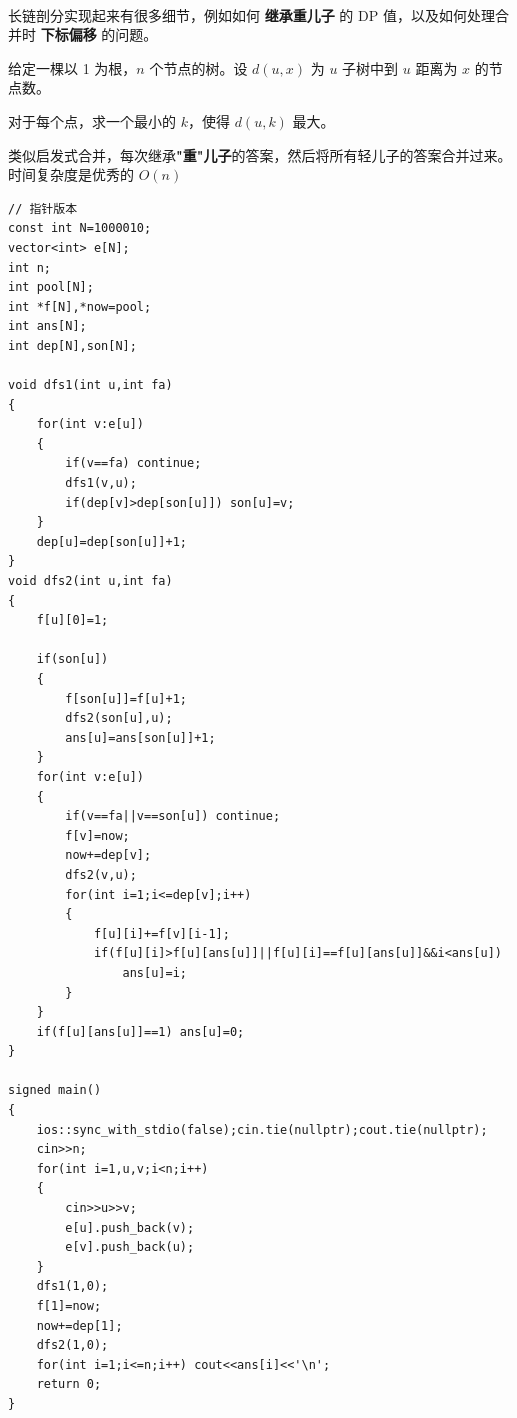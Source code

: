 ~\\
\par \noindent 长链剖分实现起来有很多细节，例如如何 \textbf{继承重儿子} 的 DP 值，以及如何处理合并时 \textbf{下标偏移} 的问题。

\begin{tcolorbox}
\par \noindent 给定一棵以 1 为根，$n$ 个节点的树。设 $d(u,x)$ 为 $u$ 子树中到 $u$ 距离为 $x$ 的节点数。

\par \noindent 对于每个点，求一个最小的 $k$，使得 $d(u,k)$ 最大。
\end{tcolorbox}

\par \noindent 类似启发式合并，每次继承\textbf{"重"儿子}的答案，然后将所有轻儿子的答案合并过来。时间复杂度是优秀的 $O(n)$

\begin{verbatim}
// 指针版本
const int N=1000010;
vector<int> e[N];
int n;
int pool[N];
int *f[N],*now=pool;
int ans[N];
int dep[N],son[N];

void dfs1(int u,int fa)
{
    for(int v:e[u])
    {
        if(v==fa) continue;
        dfs1(v,u);
        if(dep[v]>dep[son[u]]) son[u]=v;
    }
    dep[u]=dep[son[u]]+1;
}
void dfs2(int u,int fa)
{
    f[u][0]=1;

    if(son[u])
    {
        f[son[u]]=f[u]+1;
        dfs2(son[u],u);
        ans[u]=ans[son[u]]+1;
    }
    for(int v:e[u])
    {
        if(v==fa||v==son[u]) continue;
        f[v]=now;
        now+=dep[v];
        dfs2(v,u);
        for(int i=1;i<=dep[v];i++)
        {
            f[u][i]+=f[v][i-1];
            if(f[u][i]>f[u][ans[u]]||f[u][i]==f[u][ans[u]]&&i<ans[u])
                ans[u]=i;
        }
    }
    if(f[u][ans[u]]==1) ans[u]=0;
}

signed main()
{
    ios::sync_with_stdio(false);cin.tie(nullptr);cout.tie(nullptr);
    cin>>n;
    for(int i=1,u,v;i<n;i++)
    {
        cin>>u>>v;
        e[u].push_back(v);
        e[v].push_back(u);
    }
    dfs1(1,0);
    f[1]=now;
    now+=dep[1];
    dfs2(1,0);
    for(int i=1;i<=n;i++) cout<<ans[i]<<'\n';
    return 0;
}
\end{verbatim}


